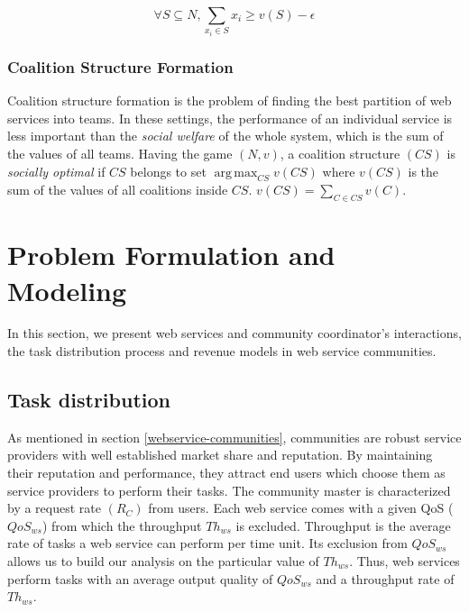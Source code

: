\documentclass[10pt,journal,cspaper,compsoc]{IEEEtran}
\begin{document}
\begin{equation}\label{eq:core2}
\forall S \subseteq N, \sum_{x_i \in S} x_i \geq v(S) - \epsilon
\end{equation}

\subsubsection*{Coalition Structure Formation}\label{sec:coalition}

Coalition structure formation is the problem of finding the best
partition of web services into teams. In these settings, the
performance of an individual service is less important than the
\emph{social welfare} of the whole system, which is the sum of the
values of all teams. Having the game $(N,v)$, a coalition
structure $(CS)$ is \emph{socially optimal} if $CS$ belongs to set
$\operatorname*{arg\,max}_{CS} v(CS)$ where $v(CS)$ is the sum of
the values of all coalitions inside $CS$. $v(CS) = \sum_{C \in
CS}v(C)$.


\section{Problem Formulation and Modeling}\label{s:model}

In this section, we present  web services and community coordinator's interactions, the task distribution process and revenue models in web service communities.

\subsection{Task distribution}

As mentioned in section \ref{webservice-communities}, communities are robust service providers with well established market share and reputation. By maintaining their reputation and performance, they attract  end users which choose them as service providers to perform their tasks. The community master is characterized by a request rate $(R_C)$ from users. Each web service comes with a given QoS ($QoS_{ws}$) from which the throughput $Th_{ws}$ is excluded. Throughput is the average rate of tasks a web service can perform per time unit. Its exclusion from $QoS_{ws}$ allows us to build our analysis on the particular value of $Th_{ws}$. Thus, web services perform tasks with an average output quality of $QoS_{ws}$ and a throughput rate of $Th_{ws}$.
\end{document}
